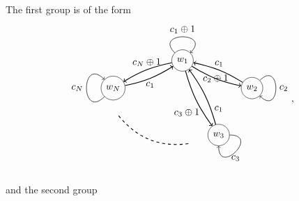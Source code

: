 \documentclass[a4paper,twocolumn,8pt,accepted=2021-12-15]{quantumarticle}
\begin{document}
	The first group is of the form
	\begin{align}\label{wbasis_1}
		\begin{tikzpicture}[baseline={([yshift=-.5ex]current bounding box.center)}]
			\node[circle,draw] (a) at (6,2.7) {$w_1$};
			\node[circle,draw] (b) at (8.5,1.7) {$w_2$};		
			\node[circle,draw] (c) at (7.3,0) {$w_3$};
			\node[circle,draw] (e) at (3.5,1.7) {$w_N$};		
			\path[every loop/.style={min distance=10mm,in=45,out=135,looseness=5,->},line width = 0.5pt] (a) edge [loop above] node[above] {$c_1\oplus 1$}  (a);
			\path[every loop/.style={min distance=10mm,in=-45,out=45,looseness=5},line width = 0.5pt,->] (b) edge [loop above] node[right] {$c_2$} (b);
			\path[every loop/.style={min distance=10mm,in=270,out=0,looseness=5,->},line width = 0.5pt] (c) edge [loop above] node[below] {$c_3$} (c);
			\path[every loop/.style={min distance=10mm,in=135,out=-135,looseness=5,->},line width = 0.5pt] (e) edge [loop above] node[left] {$c_N$} (e);	
			\draw[thick, dashed] (3.7,0.7) to[bend right=30] (6.3,-.3);	
			\path[line width = 0.8pt,->] (a) edge [bend right=10] node {$c_2\oplus 1$} (b);
			\path[line width = 0.8pt,->] (a) edge [bend right=10] node[near end, left] {$c_3\oplus 1$} (c);
			\path[line width = 0.8pt,->] (a) edge [bend right=10] node[above] {$c_N\oplus 1$} (e);
			\path[line width = 0.8pt,->] (b) edge [bend right=10] node[above] {$c_1$} (a);
			\path[line width = 0.8pt,->] (c) edge [bend right=10] node[near start, right] {$c_1$} (a);
			\path[line width = 0.8pt,->] (e) edge [bend right=10] node[below] {$c_1$} (a);							
		\end{tikzpicture} ,
	\end{align} and the second group 
\end{document}

